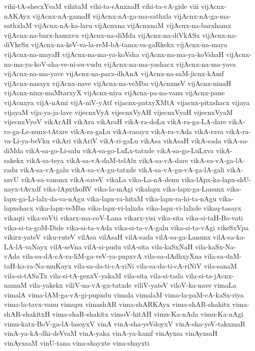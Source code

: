 {vihi-tA-shecxYvaM
vihitaM
vihi-ta-sAnxnaH
vihi-ta-vA-gide
viii
vijAcnx-nAKAyx
vijAcnx-nA-gamaH
vijAcnx-nA-ga-ma-sathxla
vijAcnx-nA-ga-ma-sathxlaM
vijAcnx-nA-ka-laru
vijAcnxna
vijAcnxnaM
vijAcnx-na-barxhamx
vijAcnx-na-barx-hamxvu
vijAcnx-na-diMda
vijAcnx-na-diVkASx
vijAcnx-na-diVkeSx
vijAcnx-na-keV-va-la-reM-bA-tamx-va-gaRkekx
vijAcnx-na-maya
vijAcnx-na-mayaH
vijAcnx-na-ma-ya-koVsha
vijAcnx-na-ma-ya-koVshaH
vijAcnx-na-ma-ya-koV-sha-ve-ni-su-vudu
vijAcnx-na-ma-yashacx
vijAcnx-na-ma-yava
vijAcnx-na-ma-yave
vijAcnx-na-parx-dhAnA
vijAcnx-na-saM-jicnx-kAmf
vijAcnx-nasayx
vijAcnx-nave
vijAcnx-na-veMba
vijAcnxneV
vijAcnx-ninaH
vijAcnx-ninx-maMtarxyX
vijAcnx-niya
vijAcnx-pa-na-vanu
vijAcnx-pane
vijAcnxya
vijA-nAmi
vijA-niV-yAtf
vijacnx-patxyXMtA
vijacnx-pitxshacx
vijaya
vijayaM
vija-ya-ja-lave
vijecnxVyA
vijecnxVyAH
vijecnxVyaH
vijecnxVyaM
vijecnxVyoV
vikArAH
vikAra
vikAraH
vikA-ra-doLu
vikA-ra-ga-LA-dare
vikA-ra-ga-Le-nunx-tAtxre
vikA-ra-gaLu
vikA-rasayx
vikA-ra-vAda
vikA-rava
vikA-ra-va-Li-ya-beVku
vikAri
vikAriV
vikA-ri-gaLu
vikAsa
vikAsaH
vikA-sada
vikA-sa-diMda
vikA-sa-go-Li-salu
vikA-sa-go-LuLx-tatxde
vikA-sa-go-LuLxva
vikA-sakekx
vikA-sa-teya
vikA-sa-vA-daM-telAlx
vikA-sa-vA-dare
vikA-sa-vA-ga-lA-radu
vikA-sa-vA-galu
vikA-sa-vA-gu-tatxde
vikA-sa-vA-gu-vA-ga-lA-gali
vikA-savU
vikA-sa-vanunx
vikA-saveV
vikaLa
vika-La-nA-denu
vika-lApx-ka-lapx-shU-nayx-tAvxdf
vika-lApxthoRV
vika-la-mAgi
vikalapx
vika-lapx-ga-Lanunx
vika-lapx-ga-Li-lalx-da-va-nAgu
vika-lapx-ra-hitaM
vika-lapx-ra-hi-ta-nAgu
vika-lapxshacx
vika-lapx-veMba
vika-lapx-vi-lalxda
vika-lapx-vi-lalxde
vikaq-tasayx
vikaqti
vika-roVti
vikarx-ma-coV-Lana
vikarx-yisi
vika-sita
vika-si-taH-Ba-vati
vika-si-ta-goM-Dide
vika-si-ta-vAda
vika-si-ta-vA-galu
vika-si-ta-vAgi
vikeSxVpa
vikirx-yateV
viku-ruteV
vilAsa
vilAsaH
vilA-sada
vilA-sa-ga-Lanunx
vilA-sa-ka-LA-lA-vaNayx
vilA-seVna
vilA-si-pudu
vilA-sita
vila-kaSxNaH
vila-kaSx-Na-vAda
vila-sa-dA-cA-ra-liM-ga-veV-ya-pupxvA
vila-sa-dAdhxyXna
vila-sa-daM-taH-ka-ra-Na-muKayx
vila-sa-da-ti-cA-riNi
vila-sa-da-ti-cA-riNiV
vila-sanaM
vila-si-tASaTx
vila-si-tA-genxV-yakaM
vila-sita
vila-si-tada
vila-si-ta-jAcnx-namuM
vila-yakekx
viliV-na-vA-gu-tatxde
viliV-yateV
viloV-ka-nave
vimaLa
vimalA
vima-lAM-ga-vA-gi-pupxdu
vimala
vimalaM
vima-la-paM-cA-kaSx-riya
vima-la-tavx-vanu
vimapu
vimashAR
vima-shARKAyx
vima-shAR-shakitx
vima-shAR-shakitxH
vima-shaR-shakitx
vimoV-hitAH
vimu-Ka-nAda
vimu-Ka-nAgi
vimu-katx-BoV-ga-lA-lasoyxV
vinA
vinA-sha-yeVdoyxV
vinA-sha-yeV-takxmaR
vinA-ya-kA-dhi-deVvaM
vinA-yaka
vinA-ya-kamf
vinAyxsa
vinAyxsaH
vinAyxsaM
vinU-tana
vina-shayxte
vina-shayxti
}
